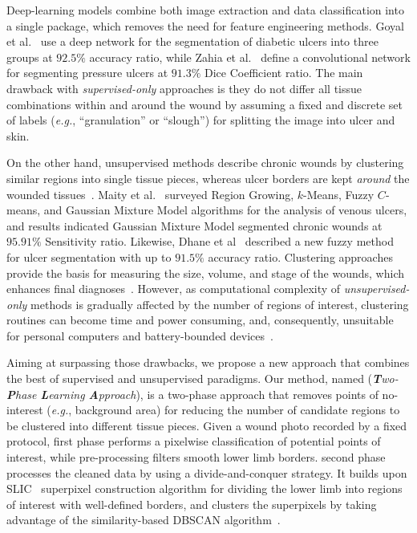 Deep-learning models combine both image extraction and data classification into a single package, which removes the need for feature engineering methods.
Goyal et al.~\cite{Goyal2018} use a deep network for the segmentation of diabetic ulcers into three groups at $92.5\%$ accuracy ratio, while Zahia et al.~\cite{Zahia2018} define a convolutional network for segmenting pressure ulcers at $91.3\%$ Dice Coefficient ratio.
The main drawback with \textit{supervised-only} approaches is they do not differ all tissue combinations within and around the wound by assuming a fixed and discrete set of labels (\textit{e.g.}, ``granulation'' or ``slough'') for splitting the image into ulcer and skin.

On the other hand, unsupervised methods describe chronic wounds by clustering similar regions into single tissue pieces, whereas ulcer borders are kept \textit{around} the wounded tissues~\cite{Dhane2017,Bates2016}.
Maity et al.~\cite{Maity2018} surveyed Region Growing, $k$-Means, Fuzzy $C$-means, and Gaussian Mixture Model algorithms for the analysis of venous ulcers, and results indicated Gaussian Mixture Model segmented chronic wounds at $95.91\%$ Sensitivity ratio.
Likewise, Dhane et al~\cite{Dhane2017} described a new fuzzy method for ulcer segmentation with up to $91.5\%$ accuracy ratio. 
Clustering approaches provide the basis for measuring the size, volume, and stage of the wounds, which enhances final diagnoses~\cite{Bates2016,Todd2018}.
However, as computational complexity of \textit{unsupervised-only} methods is gradually affected by the number of regions of interest, clustering routines can become time and power consuming, and, consequently, unsuitable for personal computers and battery-bounded devices~\cite{Deserno2018}. 

Aiming at surpassing those drawbacks, we propose a new approach that combines the best of supervised and unsupervised paradigms.
Our method, named \system (\textit{\textbf{T}wo-\textbf{P}hase \textbf{L}earning \textbf{A}pproach}), is a two-phase approach that removes points of no-interest (\textit{e.g.}, background area) for reducing the number of candidate regions to be clustered into different tissue pieces.
Given a wound photo recorded by a fixed protocol, \system first phase performs a pixelwise classification of potential points of interest, while pre-processing filters smooth lower limb borders.
\system second phase processes the cleaned data by using a divide-and-conquer strategy. 
It builds upon SLIC~\cite{Achanta2012} superpixel construction algorithm for dividing the lower limb into regions of interest with well-defined borders, and clusters the superpixels by taking advantage of the similarity-based DBSCAN algorithm~\cite{Kriegel2017}.

